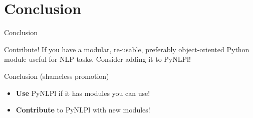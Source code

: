 \documentclass[compress]{beamer}
\begin{document}
\section{Conclusion}

\begin{frame}{Conclusion}

    \begin{block}{Contribute!}
        If you have a modular, re-usable, preferably object-oriented Python module useful for NLP tasks. Consider adding it to PyNLPl!                    
    \end{block}

 \begin{block}{Conclusion (shameless promotion)}
    \begin{itemize}
    \item \textbf{Use} PyNLPl if it has modules you can use!
    \item \textbf{Contribute} to PyNLPl with new modules!
    \end{itemize}
    
 \end{block}
 
 \smallraccoon
\end{frame}


    
\end{document}
